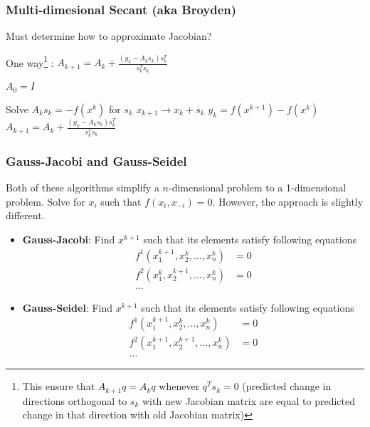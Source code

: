 \documentclass[10pt]{beamer}
\begin{document}
\begin{frame} \frametitle{Multi-dimesional Secant (aka Broyden)}

  Must determine how to approximate Jacobian?

  One way\footnote{This ensure that $A_{k+1} q = A_k q$ whenever $q^T s_k = 0$ (predicted change in directions orthogonal to $s_k$ with new Jacobian matrix are equal to predicted change in that direction with old Jacobian matrix)}
: $A_{k+1} = A_k + \frac{(y_k - A_k s_k) s_k^T}{s_k^T s_k}$

  \vspace{0.3cm}

  \begin{algorithmic}

    \STATE $A_0 = I$

    \STATE Solve $A_k s_k = - f(x^k)$ for $s_k$
    \STATE $x_{k+1} \rightarrow x_k + s_k$
    \STATE $y_k = f(x^{k+1}) - f(x^k)$
    \STATE $A_{k+1} = A_k + \frac{(y_k - A_k s_k) s_k^T}{s_k^T s_k}$
    \ENDWHILE

  \end{algorithmic}

\end{frame}

\begin{frame} \frametitle{Gauss-Jacobi and Gauss-Seidel}

  Both of these algorithms simplify a $n$-dimensional problem to a 1-dimensional problem. Solve for $x_i$ such that $f(x_i, x_{-i}) = 0$. However, the approach is slightly different.

  \begin{itemize}
    \item \textbf{Gauss-Jacobi}: Find $x^{k+1}$ such that its elements satisfy following equations
    \begin{align*}
      f^1(x_1^{k+1}, x_2^k, \dots, x_n^k) &= 0 \\
      f^2(x_1^{k}, x_2^{k+1}, \dots, x_n^k) &= 0 \\
      \dots
    \end{align*}
    \item \textbf{Gauss-Seidel}: Find $x^{k+1}$ such that its elements satisfy following equations
    \begin{align*}
      f^1(x_1^{k+1}, x_2^k, \dots, x_n^k) &= 0 \\
      f^2(x_1^{k+1}, x_2^{k+1}, \dots, x_n^k) &= 0 \\
      \dots
    \end{align*}
  \end{itemize}

\end{frame}
\end{document}
